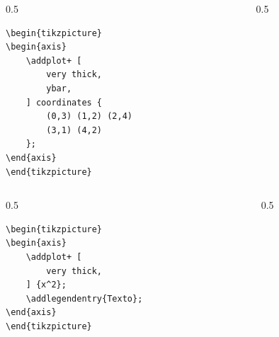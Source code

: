 \documentclass[12pt,aspectratio=169,ignorenonframetext]{ltxbeamer}
\begin{document}
\begin{frame}[fragile]
\bigskip

\begin{columns}
    \begin{column}{0.5\textwidth}
        \begin{verbatim}
\begin{tikzpicture}
\begin{axis}
    \addplot+ [
        very thick,
        ybar,
    ] coordinates {
        (0,3) (1,2) (2,4)
        (3,1) (4,2)
    };
\end{axis}
\end{tikzpicture}
        \end{verbatim}
    \end{column}
    {\color{gray} \vline}
    \begin{column}{0.5\textwidth}
    \end{column}
\end{columns}
\end{frame}





\begin{frame}[fragile]
\bigskip

\begin{columns}
    \begin{column}{0.5\textwidth}
        \begin{verbatim}
\begin{tikzpicture}
\begin{axis}
    \addplot+ [
        very thick,
    ] {x^2};
    \addlegendentry{Texto};
\end{axis}
\end{tikzpicture}
        \end{verbatim}
    \end{column}
    {\color{gray} \vline}
    \begin{column}{0.5\textwidth}
        \lmr
    \end{column}
\end{columns}
\end{frame}
\end{document}
